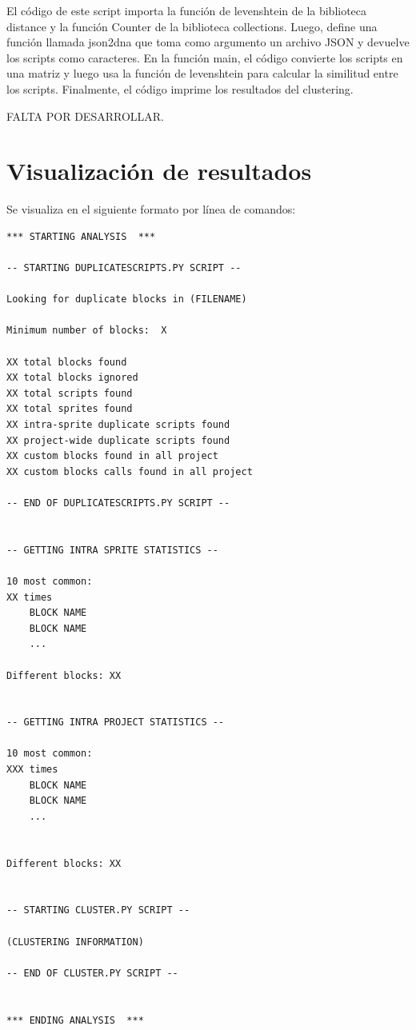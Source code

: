 \documentclass[a4paper, 12pt]{book}
\begin{document}
El código de este script importa la función de levenshtein de la biblioteca distance y la función Counter de la biblioteca collections. Luego, define una función llamada json2dna que toma como argumento un archivo JSON y devuelve los scripts como caracteres. En la función main, el código convierte los scripts en una matriz y luego usa la función de levenshtein para calcular la similitud entre los scripts. Finalmente, el código imprime los resultados del clustering.

FALTA POR DESARROLLAR.

\section{Visualización de resultados} 
\label{sec:visualizacionresultados}

Se visualiza en el siguiente formato por línea de comandos:

\begin{lstlisting}[style=consola,numbers=none]
*** STARTING ANALYSIS  ***

-- STARTING DUPLICATESCRIPTS.PY SCRIPT --

Looking for duplicate blocks in (FILENAME)

Minimum number of blocks:  X

XX total blocks found
XX total blocks ignored
XX total scripts found
XX total sprites found
XX intra-sprite duplicate scripts found
XX project-wide duplicate scripts found
XX custom blocks found in all project
XX custom blocks calls found in all project

-- END OF DUPLICATESCRIPTS.PY SCRIPT --


-- GETTING INTRA SPRITE STATISTICS --

10 most common:
XX times
	BLOCK NAME 
	BLOCK NAME
	...

Different blocks: XX


-- GETTING INTRA PROJECT STATISTICS --

10 most common:
XXX times
	BLOCK NAME
	BLOCK NAME
	...


Different blocks: XX


-- STARTING CLUSTER.PY SCRIPT --

(CLUSTERING INFORMATION)

-- END OF CLUSTER.PY SCRIPT --


*** ENDING ANALYSIS  ***


\end{lstlisting}

\end{document}
